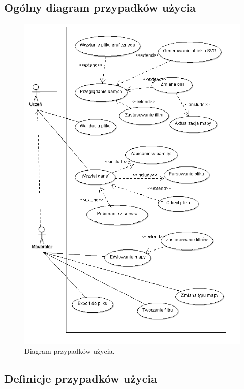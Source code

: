 \subsection{Ogólny diagram przypadków użycia}
\label{sec:diagramcaseuse}


\begin{center}
\begin{figure}[H]
\centering
     \includegraphics[origin=c,width=130mm]{ge/smieci/caseUse.png}
      \caption{Diagram przypadków użycia.}
       \label{fig:caseuse}
\end{figure}
\end{center}

\subsection{Definicje przypadków użycia}
\label{sec:defCaseuse}

